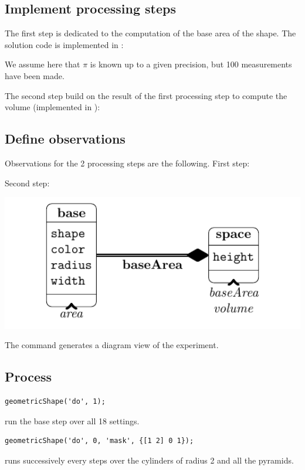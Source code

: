 \documentclass[a4paper,fleqn]{tufte-handout}
\begin{document}
\subsection{Implement processing steps}

The first step is dedicated to the computation of the base area of the shape. The solution code is implemented in :

We assume here that $\pi$ is known up to a given precision, but 100 measurements have been made.

The second step build on the result of the first processing step to compute the volume (implemented in ):


\subsection{Define observations}

Observations for the 2 processing steps are the following. First step:

Second step:


\begin{marginfigure}
\includegraphics[width=1.2\textwidth]{../demo/geometricShape/report/figures/factors}
\end{marginfigure}

The command  generates a diagram view of the experiment.

\subsection{Process}

\begin{lstlisting}
geometricShape('do', 1);
\end{lstlisting}
run the base step over all 18 settings.
\begin{lstlisting}
geometricShape('do', 0, 'mask', {[1 2] 0 1});
\end{lstlisting}
runs successively every steps over the cylinders of radius 2  and all the pyramids.
\end{document}
